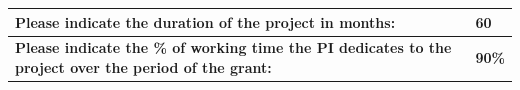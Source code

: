 \documentclass[11pt,a4paper]{article}
\begin{document}
\begin{center}
	\begin{tabular}{||L{14.0 cm}|R{1.2 cm}||}
		\hline
		\hline
		\textbf{Please indicate the duration of the project in months:} & 60\\
		\hline
		\hline
		\textbf{Please indicate the \% of working time the PI dedicates to the project over the period of the grant:} & \textbf{90\%} \\
		\hline
		\hline
	\end{tabular}
\end{center}

%		
%		
%		
\end{document}
